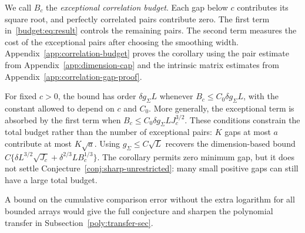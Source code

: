 \documentclass[11pt,letterpaper]{article}
\theoremstyle{remark}
\begin{document}
We call $B_c$ the \emph{exceptional correlation budget}. Each gap
below $c$ contributes its square root, and perfectly correlated pairs
contribute zero. The first term in~\eqref{budget:eq:result} controls
the remaining pairs. The second term measures the cost of the
exceptional pairs after choosing the smoothing width. Appendix~\ref{app:correlation-budget}
proves the corollary using the pair estimate from
Appendix~\ref{app:dimension-cap} and the intrinsic matrix estimates
from Appendix~\ref{app:correlation-gap-proof}.

For fixed $c>0$, the bound has order $\delta g_\Sigma L$ whenever
$B_c\le C_0\delta g_\Sigma L$, with the constant allowed to depend
on $c$ and $C_0$. More generally, the exceptional term is absorbed
by the first term when $B_c\le C_0\delta g_\Sigma LJ_c^{3/2}$.
These conditions constrain the total budget rather than the number
of exceptional pairs: $K$ gaps at most $a$ contribute at most
$K\sqrt a$. Using $g_\Sigma\le C\sqrt L$ recovers the dimension-based
bound $C\{\delta L^{3/2}\sqrt{J_c}+\delta^{2/3}LB_c^{1/3}\}$.
The corollary permits zero minimum gap, but it does not settle
Conjecture~\ref{conj:sharp-unrestricted}: many small positive gaps
can still have a large total budget.


A bound on the cumulative comparison error without the extra logarithm for all bounded arrays would give the full conjecture
and sharpen the polynomial transfer in Subsection~\ref{poly:transfer-sec}.
\end{document}
